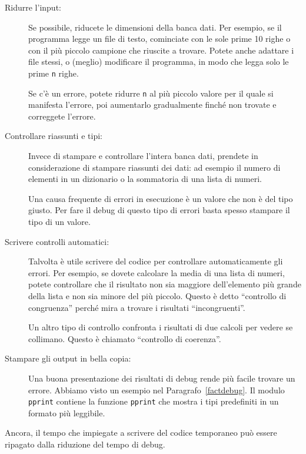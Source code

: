 \documentclass[10pt]{book}
\begin{document}
\begin{description}

\item[Ridurre l'input:] Se possibile, riducete le dimensioni della banca dati. Per esempio, se il programma legge un file di testo, cominciate con le sole prime 10 righe o con il più piccolo campione che riuscite a trovare. Potete anche adattare i file stessi, o (meglio) modificare il programma, in modo che legga solo le prime {\tt n} righe.

Se c'è un errore, potete ridurre {\tt n} al più piccolo valore per il quale si manifesta l'errore, poi aumentarlo gradualmente finché non trovate e correggete l'errore.

\item[Controllare riassunti e tipi:] Invece di stampare e controllare l'intera banca dati, prendete in considerazione di stampare riassunti dei dati: ad esempio il numero di elementi in un dizionario o la sommatoria di una lista di numeri.

Una causa frequente di errori in esecuzione è un valore che non è del tipo giusto. Per fare il debug di questo tipo di errori basta spesso stampare il tipo di un valore.

\item[Scrivere controlli automatici:]  Talvolta è utile scrivere del codice per controllare automaticamente gli errori. Per esempio, se dovete calcolare la media di una lista di numeri, potete controllare che il risultato non sia maggiore dell'elemento più grande della lista e non sia minore del più piccolo. Questo è detto ``controllo di congruenza'' perché mira a trovare i risultati ``incongruenti''.

Un altro tipo di controllo confronta i risultati di due calcoli per vedere se collimano. Questo è chiamato ``controllo di coerenza''.

\item[Stampare gli output in bella copia:] Una buona presentazione dei risultati di debug rende più facile trovare un errore. Abbiamo visto un esempio nel Paragrafo~\ref{factdebug}.  Il modulo {\tt pprint} contiene la funzione {\tt pprint} che mostra i tipi predefiniti in un formato più leggibile.

\end{description}

Ancora, il tempo che impiegate a scrivere del codice temporaneo può essere ripagato dalla riduzione del tempo di debug.
\end{document}
